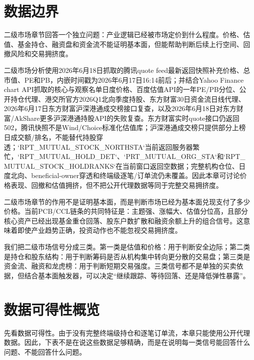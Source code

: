 \section{数据边界}

二级市场章节回答一个独立问题：产业逻辑已经被市场定价到什么程度。价格、估值、基金持仓、融资盘和资金流不能证明基本面，但能帮助判断后续上行空间、回撤风险和交易拥挤度。

\begin{sourcequalitybox}
二级市场分析使用2026年6月18日抓取的腾讯quote feed最新返回快照补充价格、总市值、PE和PB，内嵌时间戳为2026年6月17日16:14前后；并结合Yahoo Finance chart API抓取的核心与观察名单日度价格、百度估值API的一年PE/PB分位、公开持仓代理、港交所官方2026Q1北向季度持股、东方财富30日资金流日线代理、2026年6月17日东方财富沪深港通成交榜接口复查，以及2026年6月18日对东方财富/AkShare更多沪深港通持股API的失败复查。东方财富实时quote接口仍返回502，腾讯快照不是Wind/Choice标准化估值库；沪深港通成交榜只提供部分上榜日成交额/排名，不能替代持股穿透；`RPT\_MUTUAL\_STOCK\_NORTHSTA`当前返回服务器繁忙，`RPT\_MUTUAL\_HOLD\_DET`、`PRT\_MUTUAL\_ORG\_STA`和`RPT\_MUTUAL\_STOCK\_HOLDRANKS`在当前窗口返回空数据；完整机构仓位、日度北向、beneficial-owner穿透和终端级逐笔/订单流仍未覆盖。因此本章可讨论价格表现、回撤和估值拥挤，但不把公开代理数据等同于完整交易拥挤度。
\end{sourcequalitybox}

二级市场章节的作用不是证明基本面，而是判断市场已经为基本面兑现支付了多少价格。当前PCB/CCL链条的共同特征是：主题强、涨幅大、估值分位高，且部分核心资产已经出现基金重仓回落、股东户数扩散和融资余额上升的组合信号。这意味着即使产业趋势正确，投资动作也不能忽视交易拥挤度。

我们把二级市场信号分成三类。第一类是估值和价格：用于判断安全边际；第二类是持仓和股东结构：用于判断筹码是否从机构集中转向更分散的交易盘；第三类是资金流、融资和龙虎榜：用于判断短期交易强度。三类信号都不是单独的买卖依据，但结合基本面触发器，可以决定“继续跟踪、等待回落、还是降低弹性暴露”。

\section{数据可得性概览}

先看数据可得性。由于没有完整终端级持仓和逐笔订单流，本章只能使用公开代理数据。因此，下表不是在说这些数据足够精确，而是在说明每一类信号能回答什么问题、不能回答什么问题。

